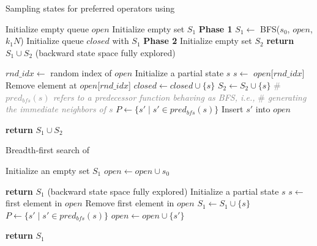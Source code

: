 \documentclass[ppgc,diss,english]{iiufrgs}
\begin{document}
\begin{algorithm}[tb]
\caption{Sampling states for preferred operators using \bfsrs}
\label{alg:sampling-po}
\begin{algorithmic}[1]
  \State Initialize empty queue $open$
  \State Initialize empty set $S_{1}$
  \State \textbf{Phase 1}
  \State $S_{1} \gets$ BFS($s_{0}$, $open$, $k_1N$)
  \State Initialize queue $closed$ with $S_{1}$
  \State \textbf{Phase 2}
  \State Initialize empty set $S_{2}$
      \State \textbf{return} $S_{1} \cup S_{2}$ (backward state space fully explored)
    \EndIf

    \State $rnd\_idx \gets$ random index of $open$
    \State Initialize a partial state $s$
    \State $s \gets$ $open$[$rnd\_idx$]
    \State Remove element at $open$[$rnd\_idx$]
    \State $closed \gets closed \cup \{s\}$
    \State $S_{2} \gets S_{2} \cup \{s\}$
    \State \textcolor{gray}{\# \emph{$pred_{bfs}(s)$ refers to a predecessor function behaving as BFS, i.e.,}}
    \State \textcolor{gray}{\# \emph{generating the immediate neighbors of $s$}}
    \State $P \gets \{s' \mid s' \in pred_{bfs}(s)\}$
        \State Insert $s'$ into $open$
      \EndIf
    \EndFor
  \EndWhile

  \State \textbf{return} $S_{1} \cup S_{2}$
\EndProcedure
\end{algorithmic}
\end{algorithm}

\begin{algorithm}[tb]
\caption{Breadth-first search of \bfsrs}
\label{alg:sampling-bfs}
\begin{algorithmic}[1]
  \State Initialize an empty set $S_{1}$
  \State $open \gets open \cup s_{0}$

      \State \textbf{return} $S_{1}$ (backward state space fully explored)
    \EndIf
    \State Initialize a partial state $s$
    \State $s \gets$ first element in $open$
    \State Remove first element in $open$
    \State $S_{1} \gets S_{1} \cup \{s\}$
    \State $P \gets \{s' \mid s' \in pred_{bfs}(s)\}$
        \State $open \gets open \cup \{s'\}$
      \EndIf
    \EndFor
  \EndWhile

  \State \textbf{return} $S_{1}$
\EndProcedure
\end{algorithmic}
\end{algorithm}
\end{document}
